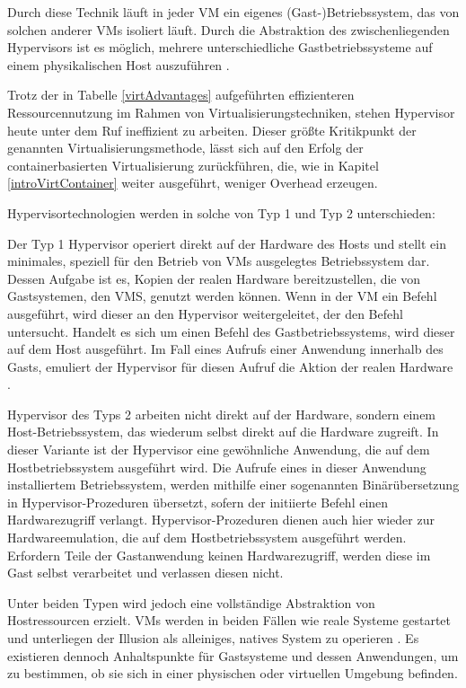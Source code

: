 \documentclass[../main.tex]{subfiles}
\begin{document}
      Durch diese Technik läuft in jeder \acrshort{VM} ein eigenes (Gast-)Betriebssystem, das von solchen anderer \acrshort{VM}s isoliert läuft. Durch die Abstraktion des zwischenliegenden Hypervisors ist es möglich, mehrere unterschiedliche Gastbetriebssysteme auf einem physikalischen Host auszuführen \cite[S.2]{containerVirtPerformance}\cite[S.106]{tanenbaumOS}.

			Trotz der in Tabelle \ref{virtAdvantages} aufgeführten effizienteren Ressourcennutzung im Rahmen von Virtualisierungstechniken, stehen Hypervisor heute unter dem Ruf ineffizient zu arbeiten. Dieser größte Kritikpunkt der genannten Virtualisierungsmethode, lässt sich auf den Erfolg der containerbasierten Virtualisierung zurückführen, die, wie in Kapitel \ref{introVirtContainer} weiter ausgeführt, weniger Overhead erzeugen.

      Hypervisortechnologien werden in solche von Typ 1 und Typ 2 unterschieden:

			Der Typ 1 Hypervisor operiert direkt auf der Hardware des Hosts und stellt ein minimales, speziell für den Betrieb von VMs ausgelegtes Betriebssystem dar. Dessen Aufgabe ist es, Kopien der realen Hardware bereitzustellen, die von Gastsystemen, den VMS, genutzt werden können. Wenn in der VM ein Befehl ausgeführt, wird dieser an den Hypervisor weitergeleitet, der den Befehl untersucht. Handelt es sich um einen Befehl des Gastbetriebssystems, wird dieser auf dem Host ausgeführt. Im Fall eines Aufrufs einer Anwendung innerhalb des Gasts, emuliert der Hypervisor für diesen Aufruf die Aktion der realen Hardware \cite[S.663ff.]{tanenbaumOS}.

			Hypervisor des Typs 2 arbeiten nicht direkt auf der Hardware, sondern einem Host-Betriebssystem, das wiederum selbst direkt auf die Hardware zugreift. In dieser Variante ist der Hypervisor eine gewöhnliche Anwendung, die auf dem Hostbetriebssystem ausgeführt wird. Die Aufrufe eines in dieser Anwendung installiertem Betriebssystem, werden mithilfe einer sogenannten Binärübersetzung in Hypervisor-Prozeduren übersetzt, sofern der initiierte Befehl einen Hardwarezugriff verlangt. Hypervisor-Prozeduren dienen auch hier wieder zur Hardwareemulation, die auf dem Hostbetriebssystem ausgeführt werden. Erfordern Teile der Gastanwendung keinen Hardwarezugriff, werden diese im Gast selbst verarbeitet und verlassen diesen nicht.

			Unter beiden Typen wird jedoch eine vollständige Abstraktion von Hostressourcen erzielt. VMs werden in beiden Fällen wie reale Systeme gestartet und unterliegen der Illusion als alleiniges, natives System zu operieren \cite[S.665f.]{tanenbaumOS}. Es existieren dennoch Anhaltspunkte für Gastsysteme und dessen Anwendungen, um zu bestimmen, ob sie sich in einer physischen oder virtuellen Umgebung befinden.
\end{document}
